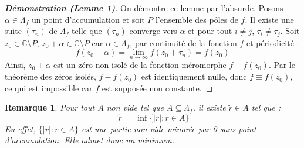 \documentclass[12pt]{article}
\newtheorem{remark}{Remarque}
\begin{document}
\begin{proof}[\textbf{Démonstration (Lemme 1)}]
On démontre ce lemme par l'absurde. Posons \( \alpha \in \Lambda_f \) un point d'accumulation et soit \( P \) l'ensemble des pôles de \( f \). Il existe une suite \( (\tau_n) \) de \( \Lambda_f \) telle que \( (\tau_n) \) converge vers \( \alpha \) et pour tout \( i \neq j \), \( \tau_i \neq \tau_j \). Soit \( z_0 \in \mathbb{C}\setminus P \), \( z_0 + \alpha \in \mathbb{C}\setminus P \) car \( \alpha \in \Lambda_f \), par continuité de la fonction \( f \) et périodicité : 
\[
f(z_0 + \alpha) = \lim_{n \to \infty} f(z_0 + \tau_n) = f(z_0)
\]
Ainsi, \( z_0 + \alpha \) est un zéro non isolé de la fonction méromorphe \( f - f(z_0) \). Par le théorème des zéros isolés, \( f - f(z_0) \) est identiquement nulle, donc \( f \equiv f(z_0) \), ce qui est impossible car \( f \) est supposée non constante.
\end{proof}
\begin{remark}
    Pour tout \( A \) non vide tel que \( A \subseteq \Lambda_f \), il existe \( \tilde{r} \in A \) tel que :
    \[ 
    |\tilde{r}| = \inf\{|r| : r \in A\} 
    \]
    En effet, $ \{|r| : r \in A\} $ est une partie non vide minorée par 0 sans point d'accumulation. Elle admet donc un minimum.
\end{remark}
\end{document}
